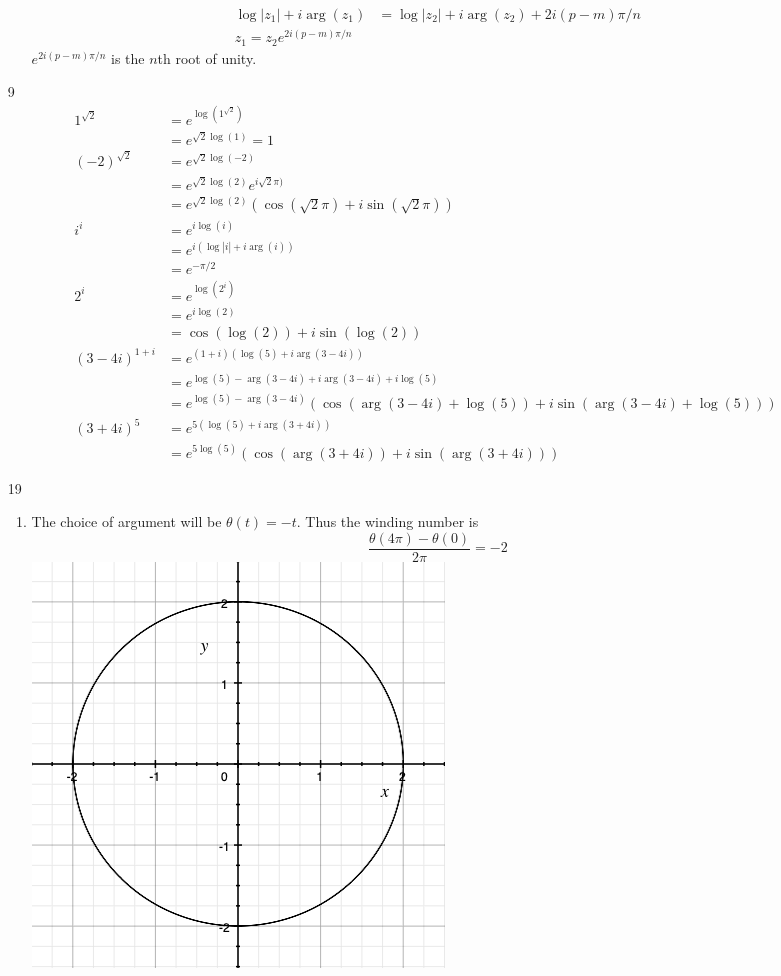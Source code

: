 \documentclass{article}
\begin{document}
\begin{enumerate}
\begin{enumerate}[label=(\roman*)]
\begin{align*}
            \log|z_1|+i\arg(z_1)&=\log|z_2|+i\arg(z_2)+2i(p-m)\pi/n\\
            z_1=z_2e^{2i(p-m)\pi/n}
          \end{align*}
          $e^{2i(p-m)\pi/n}$ is the $n$th root of unity.
      \end{enumerate}
    \item[9]
      \begin{align*}
        1^{\sqrt{2}}&=e^{\log(1^{\sqrt{2}})}\\
        &=e^{\sqrt{2}\log(1)}=1\\
        (-2)^{\sqrt{2}}&=e^{\sqrt{2}\log(-2)}\\
        &=e^{\sqrt{2}\log(2)}e^{i\sqrt{2}\pi)}\\
        &=e^{\sqrt{2}\log(2)}(\cos(\sqrt{2}\pi)+i\sin(\sqrt{2}\pi))\\
        i^i&=e^{i\log(i)}\\
        &=e^{i(\log|i|+i\arg(i))}\\
        &=e^{-\pi/2}\\
        2^i&=e^{\log(2^i)}\\
        &=e^{i\log(2)}\\
        &=\cos(\log(2))+i\sin(\log(2))\\
        (3-4i)^{1+i}&=e^{(1+i)(\log(5)+i\arg(3-4i))}\\
        &=e^{\log(5)-\arg(3-4i)+i\arg(3-4i)+i\log(5)}\\
        &=e^{\log(5)-\arg(3-4i)}(\cos(\arg(3-4i)+\log(5))+i\sin(\arg(3-4i)+\log(5)))\\
        (3+4i)^5&=e^{5(\log(5)+i\arg(3+4i))}\\
        &=e^{5\log(5)}(\cos(\arg(3+4i))+i\sin(\arg(3+4i)))
      \end{align*}
    \item[19]
      \begin{enumerate}[label=(\roman*)]
        \item
          The choice of argument will be $\theta(t)=-t$. Thus the winding number is
          \[\frac{\theta(4\pi)-\theta(0)}{2\pi}=-2\]
          \includegraphics[scale=0.5]{g1.png}

\end{enumerate}
\end{enumerate}
\end{document}
